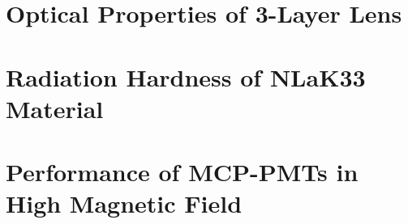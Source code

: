 \label{ch:components}

\section{Optical Properties of 3-Layer Lens}

\section{Radiation Hardness of NLaK33 Material}

\section{Performance of MCP-PMTs in High Magnetic Field}